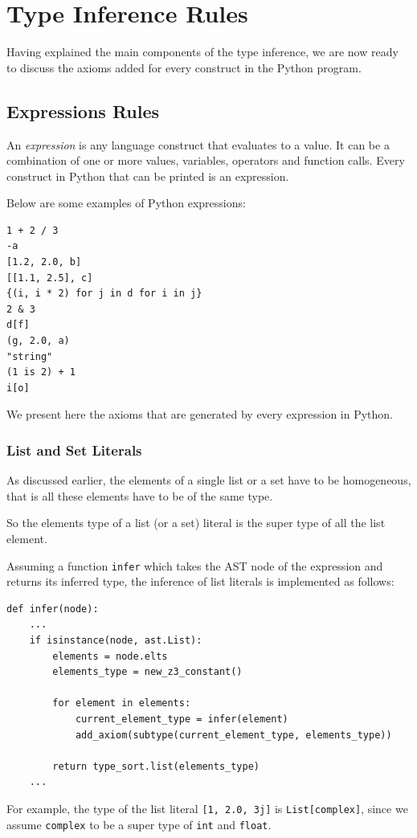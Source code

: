 \section{Type Inference Rules}
Having explained the main components of the type inference, we are now ready to discuss the axioms added for every construct in the Python program.
\subsection{Expressions Rules}
An \textit{expression} is any language construct that evaluates to a value. It can be a combination of one or more values, variables, operators and function calls. Every construct in Python that can be printed is an expression.

Below are some examples of Python expressions:
\begin{lstlisting}
1 + 2 / 3
-a
[1.2, 2.0, b]
[[1.1, 2.5], c]
{(i, i * 2) for j in d for i in j}
2 & 3
d[f]
(g, 2.0, a)
"string"
(1 is 2) + 1
i[o]
\end{lstlisting}

We present here the axioms that are generated by every expression in Python.

\subsubsection{List and Set Literals}
As discussed earlier, the elements of a single list or a set have to be homogeneous, that is all these elements have to be of the same type.

So the elements type of a list (or a set) literal is the super type of all the list element.

Assuming a function \lstinline|infer| which takes the AST node of the expression and returns its inferred type, the inference of list literals is implemented as follows:

\begin{lstlisting}
def infer(node):
	...
	if isinstance(node, ast.List):
		elements = node.elts
		elements_type = new_z3_constant()
		
		for element in elements:
			current_element_type = infer(element)
			add_axiom(subtype(current_element_type, elements_type))
			
		return type_sort.list(elements_type)
	...
\end{lstlisting}

For example, the type of the list literal \lstinline|[1, 2.0, 3j]| is \lstinline|List[complex]|, since we assume \lstinline|complex| to be a super type of \lstinline|int| and \lstinline|float|.\\


